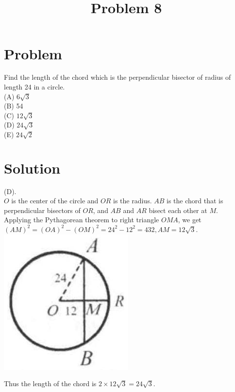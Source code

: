 \documentclass{article}
\title{Problem 8}
\date{}
\begin{document}
\maketitle

\section*{Problem}
Find the length of the chord which is the perpendicular bisector of radius of length 24 in a circle.\\
(A) \(6 \sqrt{3}\)\\
(B) 54\\
(C) \(12 \sqrt{3}\)\\
(D) \(24 \sqrt{3}\)\\
(E) \(24 \sqrt{2}\)

\section*{Solution}
(D).\\
\(O\) is the center of the circle and \(O R\) is the radius. \(A B\) is the chord that is perpendicular bisectors of \(O R\), and \(A B\) and \(A R\) bisect each other at \(M\).\\
Applying the Pythagorean theorem to right triangle \(O M A\), we get \((A M)^{2}=(O A)^{2}-(O M)^{2}=24^{2}-12^{2}=432, A M=12 \sqrt{3}\).\\
\centering
\includegraphics[width=\textwidth]{images/159(1).jpg}

Thus the length of the chord is \(2 \times 12 \sqrt{3}=24 \sqrt{3}\).\\
\end{document}
